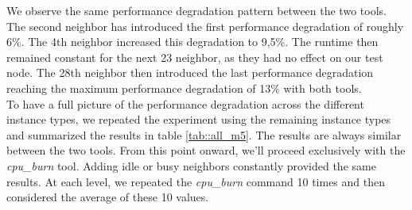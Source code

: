 \noindent
We observe the same performance degradation pattern between the two tools. The second 
neighbor has introduced the first performance degradation of roughly 6\%. The 4th neighbor increased 
this degradation to 9,5\%. The runtime then remained constant for the next 23 neighbor, as they had no 
effect on our test node. The 28th neighbor then introduced the last performance degradation reaching the 
maximum performance degradation of 13\% with both tools. \\
To have a full picture of the performance degradation across the different instance types, we repeated 
the experiment using the remaining instance types and summarized the results in table \ref{tab::all_m5}.
The results are always similar between the two tools. From this point onward, we'll proceed 
exclusively with the \textit{cpu\_burn} tool. Adding idle or busy neighbors constantly provided the 
same results. At each level, we repeated the \textit{cpu\_burn} command 10 times and then considered the 
average of these 10 values. 
 
